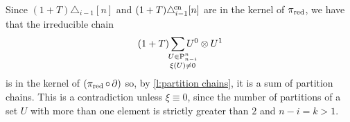 Since $(1+T)\triangle_{i-1}[n]$ and $(1+T)\triangle^{\!\mathrm{cn}}_{i-1}[n]$ are in the kernel of $\operatorname{\pi_{\text{red}}}$, we have that the irreducible chain
\[
(1+T)\sum_{\quad\mathclap{\substack{U \in \P_{n-i}^n \\ \xi(U) \neq 0}}} U^0 \ot U^1
\]
is in the kernel of $(\operatorname{\pi_{\text{red}}} \circ \operatorname{\partial})$ so, by \cref{l:partition chains}, it is a sum of partition chains.
This is a contradiction unless $\xi \equiv 0$, since the number of partitions of a set $U$ with more than one element is strictly greater than $2$ and $n-i = k > 1$.